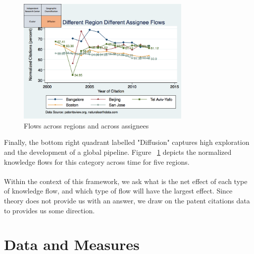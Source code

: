\documentclass[12pt]{article}
\begin{document}
\begin{figure}[h]
\begin{centering}
  \includegraphics[width=0.75\textwidth]{SMSDiffRegionDiffAssigneeFlows}
  \caption{Flows across regions and across assignees}
  \label{fig:SMSDiffRegionDiffAssigneeFlows}
\end{centering}
\end{figure}

Finally, the bottom right quadrant labelled "Diffusion" captures high exploration and the development of a global pipeline. Figure ~\ref{fig:SMSDiffRegionDiffAssigneeFlows} depicts the normalized knowledge flows for this category across time for five regions.
\\\\
Within the context of this framework, we ask what is the net effect of each type of knowledge flow, and which type of flow will have the largest effect. Since theory does not provide us with an answer, we draw on the patent citations data to provides us some direction. 


\section*{Data and Measures}
\end{document}
